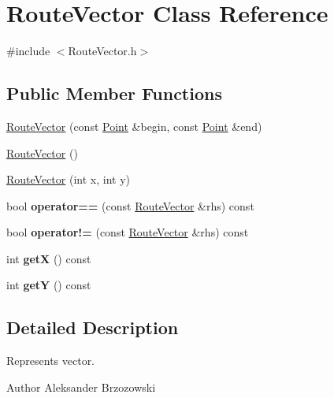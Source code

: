 \hypertarget{classRouteVector}{\section{Route\-Vector Class Reference}
\label{classRouteVector}
}


{\ttfamily \#include $<$Route\-Vector.\-h$>$}

\subsection*{Public Member Functions}
\begin{DoxyCompactItemize}
\item 
\hyperlink{classRouteVector_a08a0cdeb28a7f4de7d4be94da30debd7}{Route\-Vector} (const \hyperlink{classPoint}{Point} \&begin, const \hyperlink{classPoint}{Point} \&end)
\item 
\hyperlink{classRouteVector_ac3796e8702b7dba67eac66bfc1cb6b3b}{Route\-Vector} ()
\item 
\hyperlink{classRouteVector_a9dc4fc2b73469b6a9261036877262722}{Route\-Vector} (int x, int y)
\item 
\hypertarget{classRouteVector_a8971cddddcfa0be5fd1430ac516a69f3}{bool {\bfseries operator==} (const \hyperlink{classRouteVector}{Route\-Vector} \&rhs) const }\label{classRouteVector_a8971cddddcfa0be5fd1430ac516a69f3}

\item 
\hypertarget{classRouteVector_acc459698bbd65ed871c4b5a13466f11f}{bool {\bfseries operator!=} (const \hyperlink{classRouteVector}{Route\-Vector} \&rhs) const }\label{classRouteVector_acc459698bbd65ed871c4b5a13466f11f}

\item 
\hypertarget{classRouteVector_adf1ea492130b9f73ee1f45f4dc80b092}{int {\bfseries get\-X} () const }\label{classRouteVector_adf1ea492130b9f73ee1f45f4dc80b092}

\item 
\hypertarget{classRouteVector_a077707d02a8a63d9cdd9783e16dc8097}{int {\bfseries get\-Y} () const }\label{classRouteVector_a077707d02a8a63d9cdd9783e16dc8097}

\end{DoxyCompactItemize}


\subsection{Detailed Description}
Represents vector. \begin{DoxyAuthor}{Author}
Aleksander Brzozowski 
\end{DoxyAuthor}


